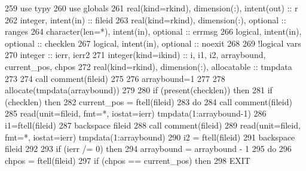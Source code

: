 \begin{DoxyCode}
259       \textcolor{keywordtype}{use }typy
260       \textcolor{keywordtype}{use }globals
261       \textcolor{keywordtype}{real(kind=rkind)}, \textcolor{keywordtype}{dimension(:)}, \textcolor{keywordtype}{intent(out)} :: r
262       \textcolor{keywordtype}{integer}, \textcolor{keywordtype}{intent(in)} :: fileid
263       \textcolor{keywordtype}{real(kind=rkind)}, \textcolor{keywordtype}{dimension(:)}, \textcolor{keywordtype}{optional} :: ranges
264       \textcolor{keywordtype}{character(len=*)}, \textcolor{keywordtype}{intent(in)}, \textcolor{keywordtype}{optional} :: errmsg
266       \textcolor{keywordtype}{logical}, \textcolor{keywordtype}{intent(in)}, \textcolor{keywordtype}{optional} :: checklen
267       \textcolor{keywordtype}{logical}, \textcolor{keywordtype}{intent(in)}, \textcolor{keywordtype}{optional} :: noexit
268       
269             \textcolor{comment}{!logical vars}
270       \textcolor{keywordtype}{integer} :: ierr, ierr2
271       \textcolor{keywordtype}{integer(kind=ikind)} :: i, i1, i2, arraybound, current\_pos, chpos
272       \textcolor{keywordtype}{real(kind=rkind)}, \textcolor{keywordtype}{dimension(:)}, \textcolor{keywordtype}{allocatable} :: tmpdata
273       
274       \textcolor{keyword}{call }comment(fileid)
275       
276       arraybound=1
277       
278       \textcolor{keyword}{allocate}(tmpdata(arraybound))
279       
280       \textcolor{keywordflow}{if} (\textcolor{keyword}{present}(checklen)) \textcolor{keywordflow}{then}
281         \textcolor{keywordflow}{if} (checklen) \textcolor{keywordflow}{then}
282           current\_pos = ftell(fileid)
283           \textcolor{keywordflow}{do} 
284             \textcolor{keyword}{call }comment(fileid)
285             \textcolor{keyword}{read}(unit=fileid, fmt=*, iostat=ierr) tmpdata(1:arraybound-1\textcolor{comment}{)}
286 \textcolor{comment}{            i1=ftell(fileid)}
287 \textcolor{comment}{            backspace fileid}
288 \textcolor{comment}{            }\textcolor{keyword}{call }comment(fileid)
289             \textcolor{keyword}{read}(unit=fileid, fmt=*, iostat=ierr) tmpdata(1:arraybound)
290             i2 = ftell(fileid)
291             backspace fileid
292            
293             \textcolor{keywordflow}{if} (ierr /= 0) \textcolor{keywordflow}{then}
294               arraybound = arraybound - 1
295               \textcolor{keywordflow}{do}
296                 chpos = ftell(fileid)
297                 \textcolor{keywordflow}{if} (chpos == current\_pos) \textcolor{keywordflow}{then}
298                   \textcolor{keywordflow}{EXIT}

\end{DoxyCode}
